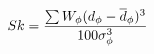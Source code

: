 \documentclass[10pt]{article}
\begin{document}
\begin{align*}Sk = {\sum W_\phi(d_\phi-\overline d_\phi)^3\over 100\sigma_\phi^3}\end{align*}
\end{document}
